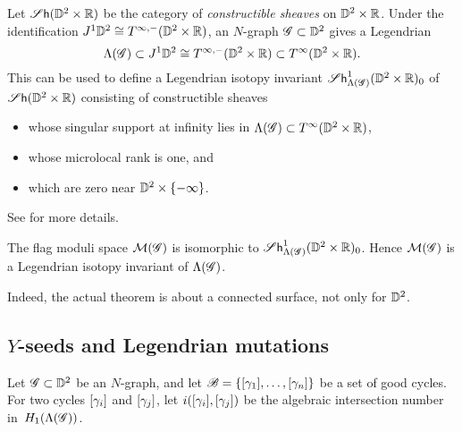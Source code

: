 Let $\operatorname{\mathscr{S}\mathsf{h}}(\mathbb{D}^2 \times \mathbb{R})$ be the category of \emph{constructible sheaves} on $\mathbb{D}^2\times \mathbb{R}$. Under the identification $J^1\mathbb{D}^2\cong T^{\infty,-}(\mathbb{D}^2\times \mathbb{R})$, an $N$-graph $\mathscr{G}\subset \mathbb{D}^2$ gives a Legendrian 
\[
\Lambda(\mathscr{G})\subset J^1 \mathbb{D}^2 
\cong T^{\infty,-}(\mathbb{D}^2\times \mathbb{R}) 
\subset T^\infty(\mathbb{D}^2\times \mathbb{R}).
\]
This can be used to define a Legendrian isotopy invariant $\operatorname{\mathscr{S}\mathsf{h}}_{\Lambda(\mathscr{G})}^1(\mathbb{D}^2 \times \mathbb{R})_{0}$ of $\operatorname{\mathscr{S}\mathsf{h}}(\mathbb{D}^2 \times \mathbb{R})$ consisting of constructible sheaves 
\begin{itemize}
\item whose singular support at infinity lies in $\Lambda(\mathscr{G})
\subset T^\infty(\mathbb{D}^2\times \mathbb{R})$,
\item whose microlocal rank is one, and
\item which are zero near $\mathbb{D}^2\times \{-\infty\}$.
\end{itemize} 
See \cite{CZ2020,GKS2012,STZ2017} for more details.

\begin{theorem}[{\cite[Theorem~5.3]{CZ2020}}]
The flag moduli space $\mathcal{M}(\mathscr{G})$ is isomorphic to $\operatorname{\mathscr{S}\mathsf{h}}_{\Lambda(\mathscr{G})}^1(\mathbb{D}^2\times\mathbb{R})_0$. Hence $\mathcal{M}(\mathscr{G})$ is a Legendrian isotopy invariant of $\Lambda(\mathscr{G})$.
\end{theorem}

\begin{remark}
Indeed, the actual theorem is about a connected surface, not only for $\mathbb{D}^2$.
\end{remark}



\subsection{$Y$-seeds and Legendrian mutations}\label{sec:N-graphs and seeds}
Let $\mathscr{G}\subset \mathbb{D}^2$ be an $N$-graph, and let $\mathscr{B}=\{[\gamma_1],\dots, [\gamma_n]\}$ be a set of good cycles.
For two cycles $[\gamma_i]$ and $[\gamma_j]$, let $i([\gamma_i], [\gamma_j])$ be the algebraic intersection number in~$H_1(\Lambda(\mathscr{G}))$.

